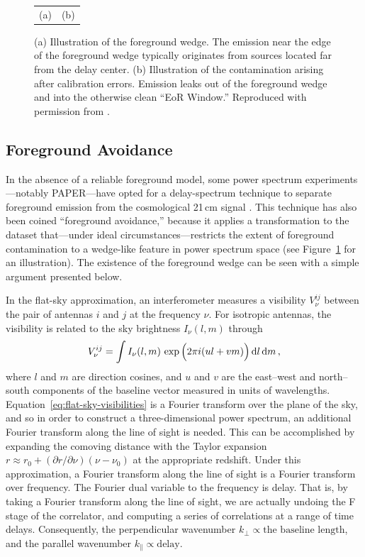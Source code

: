 \begin{bibunit}
\begin{figure}
\begin{tabular}{cc}
        (a) & (b) \\
    \end{tabular}
    \caption{
        (a) Illustration of the foreground wedge. The emission near the edge of the foreground wedge
        typically originates from sources located far from the delay center.
        (b) Illustration of the contamination arising after calibration errors. Emission leaks out
        of the foreground wedge and into the otherwise clean ``EoR Window.''
        Reproduced with permission from \citet{2012ApJ...752..137M}.
    }
    \label{fig:morales-foreground-wedge}
\end{figure}

\subsection{Foreground Avoidance}

In the absence of a reliable foreground model, some power spectrum experiments---notably
PAPER---have opted for a delay-spectrum technique to separate foreground emission from the
cosmological 21\,cm signal \citep{2012ApJ...756..165P}. This technique has also been coined
``foreground avoidance,'' because it applies a transformation to the dataset that---under ideal
circumstances---restricts the extent of foreground contamination to a wedge-like feature in power
spectrum space (see Figure~\ref{fig:morales-foreground-wedge} for an illustration). The existence of
the foreground wedge can be seen with a simple argument presented below.

In the flat-sky approximation, an interferometer measures a visibility $V^{ij}_\nu$ between the
pair of antennas $i$ and $j$ at the frequency $\nu$. For isotropic antennas, the visibility is
related to the sky brightness $I_\nu(l, m)$ through
\begin{equation}\label{eq:flat-sky-visibilities}
    V^{ij}_\nu = \int I_\nu(l, m)\,\exp\Big(2\pi i (ul + vm)\Big)\,{\textrm d} l\,{\textrm d} m\,,
\end{equation}
where $l$ and $m$ are direction cosines, and $u$ and $v$ are the east--west and north--south
components of the baseline vector measured in units of wavelengths.
Equation~\ref{eq:flat-sky-visibilities} is a Fourier transform over the plane of the sky, and so in
order to construct a three-dimensional power spectrum, an additional Fourier transform along the
line of sight is needed. This can be accomplished by expanding the comoving distance with the Taylor
expansion $r \approx r_0 + (\partial r/\partial \nu)(\nu - \nu_0)$ at the appropriate redshift.
Under this approximation, a Fourier transform along the line of sight is a Fourier transform over
frequency.  The Fourier dual variable to the frequency is delay. That is, by taking a Fourier
transform along the line of sight, we are actually undoing the F stage of the correlator, and
computing a series of correlations at a range of time delays.  Consequently, the perpendicular
wavenumber $k_\perp \propto \text{the baseline length}$, and the parallel wavenumber $k_\parallel
\propto \text{delay}$.


\end{bibunit}
